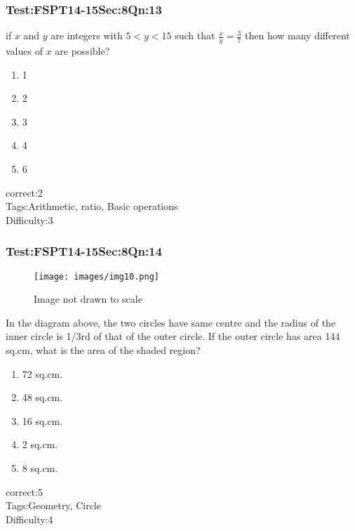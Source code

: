 \documentclass[]{beamer}
\begin{document}
    \begin{frame}
	    \frametitle{Test:FSPT14-15\hspace{2mm}Sec:8\hspace{2mm}Qn:13}
	    if $x$ and $y$ are integers with $5<y<15$ such that $\frac{x}{y}=\frac{3}{7}$ then how many different values of $x$ are possible?
	    \begin{enumerate}
	        \item
	            1
	        \item
	           2
	        \item
	           3
	        \item
	            4
	        \item
	            6
	    \end{enumerate}
	    correct:2  \\   
	    Tags:Arithmetic, ratio, Basic operations    \\
	    Difficulty:3   \\
    \end{frame}
    \begin{frame}
	    \frametitle{Test:FSPT14-15\hspace{2mm}Sec:8\hspace{2mm}Qn:14}
	    \begin{figure}
	    \begin{center}
	    \texttt{[image: images/img10.png]}
	    \end{center}
	    {Image not drawn to scale}
	    \end{figure}
	    In the diagram above, the two circles have same centre and the radius of the inner circle is 1/3rd of that of the outer circle. If the outer circle has area 144 sq.cm, what is the area of the shaded region?
	    \begin{enumerate}
	        \item
	            72 sq.cm.
	        \item
	            48 sq.cm.
	        \item
	           	16 sq.cm. 
	        \item
	            2 sq.cm.
	        \item
	            8 sq.cm.
	    \end{enumerate}
	    correct:5  \\   
	    Tags:Geometry, Circle    \\
	    Difficulty:4   \\
    \end{frame}
\end{document}
